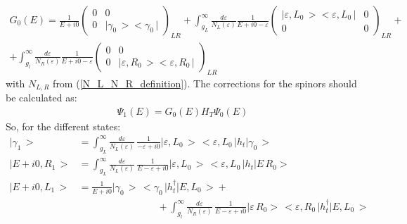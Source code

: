 \begin{multline}
	G_{0}\left(E\right)=\frac{1}{E+i0}\begin{pmatrix}0 & 0\\
	0 & \big|\gamma_{0}\,\big>\big<\gamma_{0}\,\big|
	\end{pmatrix}_{LR}+\int_{g_{L}}^{\infty}\frac{d\varepsilon}{N_{L}\left(\varepsilon\right)}\frac{1}{E+i0-\varepsilon}\begin{pmatrix}\big|\varepsilon,L_{0}\,\big>\big<\varepsilon,L_{0}\,\big| & 0\\
	0 & 0
	\end{pmatrix}_{LR}+\\+\int_{g_{l}}^{\infty}\frac{d\varepsilon}{N_{R}\left(\varepsilon\right)}\frac{1}{E+i0-\varepsilon}\begin{pmatrix}0 & 0\\
	0 & \big|\varepsilon,R_{0}\,\big>\big<\varepsilon,R_{0}\,\big|
	\end{pmatrix}_{LR}
\end{multline}
with $ N_{L,R} $ from (\ref{N_L_N_R_definition}). 
The corrections for the spinors should be calculated as:
\begin{gather}
	\Psi_{1}\left(E\right)=G_{0}\left(E\right)H_{T}\Psi_{0}\left(E\right)
\end{gather}
So, for the different states:
\begin{align}
	\big|\gamma_{1}\,\big>&=\int_{g_{L}}^{\infty}\frac{d\varepsilon}{N_{L}\left(\varepsilon\right)}\,\frac{1}{-\varepsilon+i0}\big|\varepsilon,L_{0}\,\big>\,\big<\varepsilon,L_{0}\,\big|h_{t}\big|\gamma_{0}\,\big>\\\big|E+i0,R_{1}\,\big>&=\int_{g_{L}}^{\infty}\frac{d\varepsilon}{N_{L}\left(\varepsilon\right)}\,\frac{1}{E-\varepsilon+i0}\big|\varepsilon,L_{0}\,\big>\,\big<\varepsilon,L_{0}\,\big|h_{t}\big|E\,R_{0}\big>
	\\
	\nonumber
	\big|E+i0,L_{1}\,\big>&=\frac{1}{E+i0}\big|\gamma_{0}\,\big>\,\big<\gamma_{0}\,\big|h_{t}^{\dagger}\big|E,L_{0}\,\big>+
	\\	
	&\qquad\qquad\qquad\qquad
	+\int_{g_{l}}^{\infty}\frac{d\varepsilon}{N_{R}\left(\varepsilon\right)}\,\frac{1}{E-\varepsilon+i0}\big|\varepsilon\,R_{0}\big>\,\big<\varepsilon,R_{0}\,\big|h_{t}^{\dagger}\big|E,L_{0}\,\big>
\end{align}

